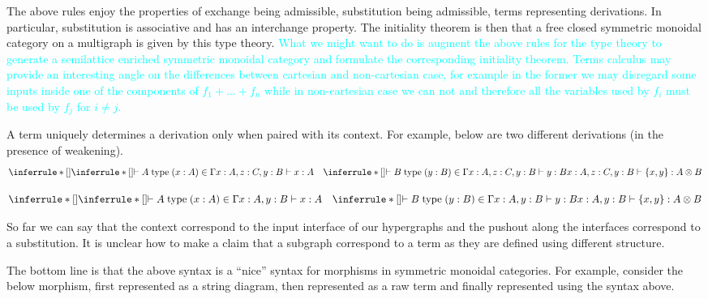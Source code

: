 \documentclass[acmsmall,screen, nonacm, anonymous]{acmart}
\begin{document}
The above rules enjoy the properties of exchange being admissible, substitution being admissible, terms representing derivations.
In particular, substitution is associative and has an interchange property.
The initiality theorem is then that a free closed symmetric monoidal category on a multigraph is given by this type theory.
\textcolor{cyan}{What we might want to do is augment the above rules for the type theory to generate a semilattice enriched symmetric monoidal category and formulate the corresponding initiality theorem.
Terms calculus may provide an interesting angle on the differences between cartesian and non-cartesian case, for example in the former we may disregard some inputs inside one of the components of $f_1 + \ldots + f_n$ while in non-cartesian case we can not and therefore all the variables used by $f_i$ must be used by $f_j$ for $i \not = j$.}

\begin{remark}
  A term uniquely determines a derivation only when paired with its context.
  For example, below are two different derivations (in the presence of weakening).
  \[
  \inferrule*[]{
    \inferrule*[]{
      \vdash A\;\text{type}\;(x : A) \in \Gamma
      }
      {x : A, z : C, y : B \vdash x : A
      }
     \quad 
      \inferrule*[]{
        \vdash B\;\text{type}\;(y : B) \in \Gamma
        }
        {x : A, z : C, y : B \vdash y : B
        }
        }
      {x : A, z : C, y : B \vdash \{x,y\} : A \otimes B}
  \]

  \[
  \inferrule*[]{
    \inferrule*[]{
      \vdash A\;\text{type}\;(x : A) \in \Gamma
      }
      {x : A, y : B \vdash x : A
      }
     \quad 
      \inferrule*[]{
        \vdash B\;\text{type}\;(y : B) \in \Gamma
        }
        {x : A, y : B \vdash y : B
        }
        }
        {x : A, y : B \vdash \{x,y\} : A \otimes B}
  \]
\end{remark}

So far we can say that the context correspond to the input interface of our hypergraphs and the pushout along the interfaces correspond to a substitution.
It is unclear how to make a claim that a subgraph correspond to a term as they are defined using different structure.

The bottom line is that the above syntax is a \enquote{nice} syntax for morphisms in symmetric monoidal categories.
For example, consider the below morphism, first represented as a string diagram, then represented as a raw term and finally represented using the syntax above.
\end{document}
